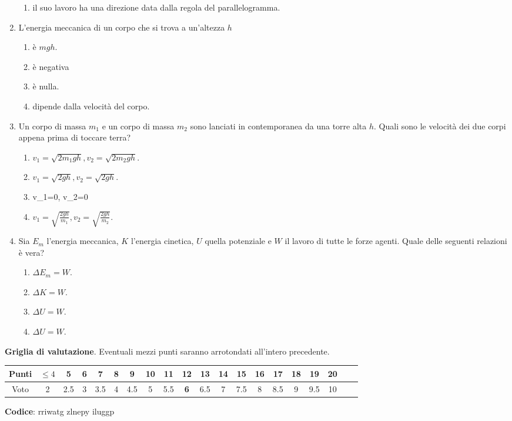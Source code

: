 \documentclass{article}
\begin{document}
\begin{enumerate}
\begin{enumerate}[label=\Alph*.]
    \item il suo lavoro ha una direzione data dalla regola del parallelogramma.
  \end{enumerate}
  \item L'energia meccanica di un corpo che si trova a un'altezza $h$
  \begin{enumerate}[label=\Alph*.]
    \item è $mgh$.
    \item è negativa
    \item è nulla.
    \item dipende dalla velocità del corpo.
  \end{enumerate}
  \item Un corpo di massa $m_1$ e un corpo di massa $m_2$ sono lanciati in contemporanea da una torre alta $h$. Quali sono le velocità dei due corpi appena prima di toccare terra?
  \begin{enumerate}[label=\Alph*.]
    \item $v_1=\sqrt{2m_1gh}, v_2=\sqrt{2m_2gh}$.
    \item $v_1=\sqrt{2gh}, v_2=\sqrt{2gh}$.
    \item v_1=0, v_2=0
    \item $v_1=\sqrt{\frac{2gh}{m_1}}, v_2=\sqrt{\frac{2gh}{m_2}}$.
  \end{enumerate}
  \item Sia $E_m$ l'energia meccanica, $K$ l'energia cinetica, $U$ quella potenziale e $W$ il lavoro di tutte le forze agenti. Quale delle seguenti relazioni è vera?
  \begin{enumerate}[label=\Alph*.]
    \item $\Delta E_m=W$.
    \item $\Delta K=W.$
    \item $\Delta U=W$.
    \item $\Delta U=W$.
  \end{enumerate}
\end{enumerate}








\newpage \maketitle \centering \textbf{Griglia di valutazione}. Eventuali mezzi punti saranno arrotondati all'intero precedente. \begin{table}[h]     \centering \begin{tabular}{|c|c|c|c|c|c|c|c|c|c|c|c|c|c|c|c|c|c|c|c|} \hline Punti &  $\leq 4$ & 5 & 6 & 7 & 8 & 9 & 10 & 11 & \textbf{12} & 13 & 14 & 15 & 16 & 17 & 18 & 19 & 20 \\ \hline Voto & 2 & 2.5 & 3 & 3.5 & 4 & 4.5 & 5 & 5.5 & \textbf{6} & 6.5 & 7 & 7.5 & 8 & 8.5 & 9 & 9.5 & 10 \\ \hline \end{tabular} \end{table}
\textbf{Codice}: rriwatg zlnepy iluggp
\end{document}
